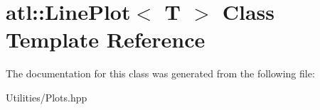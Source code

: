 \hypertarget{classatl_1_1_line_plot}{\section{atl\+:\+:Line\+Plot$<$ T $>$ Class Template Reference}
\label{classatl_1_1_line_plot}
}


The documentation for this class was generated from the following file\+:\begin{DoxyCompactItemize}
\item 
Utilities/Plots.\+hpp\end{DoxyCompactItemize}

